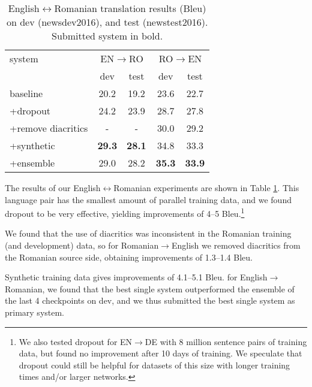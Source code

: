 \documentclass[11pt]{article}
\begin{document}
\begin{table}[t]
\centering
\begin{tabular}{l|cc|cc}
system & \multicolumn{2}{c|}{EN$\to$RO} & \multicolumn{2}{c}{RO$\to$EN}\\
& dev & test & dev & test\\
\hline
baseline & 20.2 & 19.2 &%
23.6 & 22.7\\ %
+dropout & 24.2 & 23.9 & %
28.7 & 27.8\\ %
+remove diacritics & - & - & 30.0 & 29.2\\ %
+synthetic & \textbf{29.3} & \textbf{28.1} & %
34.8 & 33.3\\ %
+ensemble & 29.0 & 28.2 & %
\textbf{35.3} & \textbf{33.9}\\ %
\end{tabular}
\caption{English$\leftrightarrow$Romanian translation results ({\sc Bleu}) on dev (newsdev2016), and test (newstest2016). Submitted system in bold.}
\label{results-ro}
\end{table}

The results of our English$\leftrightarrow$Romanian experiments are shown in Table \ref{results-ro}.
This language pair has the smallest amount of parallel training data, and we found dropout to be very effective, yielding improvements of 4--5 {\sc Bleu}.\footnote{We also tested dropout for EN$\to$DE with 8 million sentence pairs of training data, but found no improvement after 10 days of training. We speculate that dropout could still be helpful for datasets of this size with longer training times and/or larger networks.}

We found that the use of diacritics was inconsistent in the Romanian training (and development) data,  so
for Romanian$\to$English we removed diacritics from the Romanian source side, obtaining improvements of 1.3--1.4 {\sc Bleu}.

Synthetic training data gives improvements of 4.1--5.1 {\sc Bleu}.
for English$\to$Romanian, we found that the best single system outperformed the ensemble of the last 4 checkpoints on dev, and we thus submitted the best single system as primary system.
\end{document}
